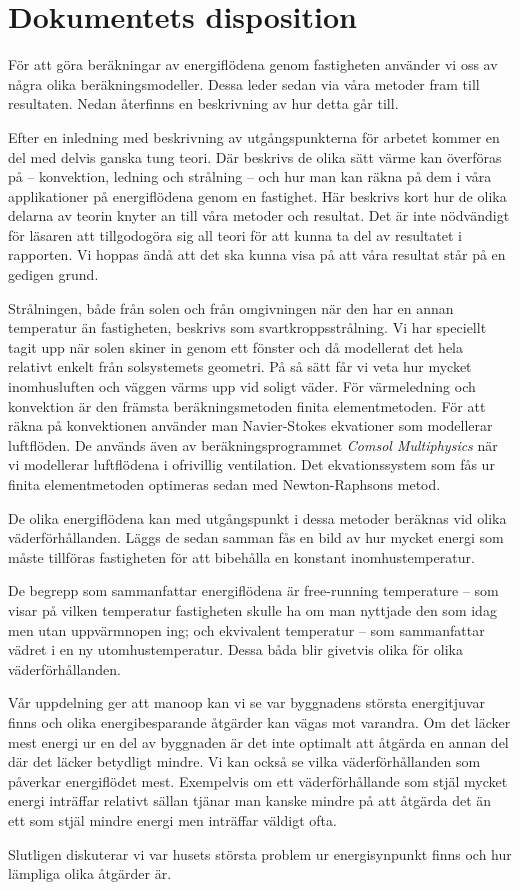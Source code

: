 \section{Dokumentets disposition}

För att göra beräkningar av energiflödena genom fastigheten använder vi oss av några olika beräkningsmodeller. Dessa leder sedan via våra metoder fram till resultaten. Nedan återfinns en beskrivning av hur detta går till.

Efter en inledning med beskrivning av utgångspunkterna för arbetet kommer en del med delvis ganska tung teori. Där beskrivs de olika sätt värme kan överföras på – konvektion, ledning och strålning – och hur man kan räkna på dem i våra applikationer på energiflödena genom en fastighet. Här beskrivs kort hur de olika delarna av teorin knyter an till våra metoder och resultat. Det är inte nödvändigt för läsaren att tillgodogöra sig all teori för att kunna ta del av resultatet i rapporten. Vi hoppas ändå att det ska kunna visa på att våra resultat står på en gedigen grund.

Strålningen, både från solen och från omgivningen när den har en annan temperatur än fastigheten, beskrivs som 
svartkroppsstrålning. Vi har speciellt tagit upp när solen skiner in genom ett fönster och då 
modellerat det hela relativt enkelt från solsystemets geometri. På så sätt får vi veta hur 
mycket inomhusluften och väggen värms upp vid soligt väder.
För värmeledning och konvektion är den främsta beräkningsmetoden finita 
elementmetoden. För att räkna på konvektionen använder man Navier-Stokes ekvationer 
som modellerar luftflöden. De används även av beräkningsprogrammet \emph{Comsol Multiphysics} när vi 
modellerar luftflödena i ofrivillig ventilation. Det ekvationssystem som fås ur finita
 elementmetoden optimeras sedan med Newton-Raphsons metod.

De olika energiflödena kan med utgångspunkt i dessa metoder beräknas vid olika väderförhållanden. Läggs de 
sedan samman fås en bild av hur mycket energi som måste tillföras fastigheten för att 
bibehålla en konstant inomhustemperatur.

De begrepp som sammanfattar energiflödena är free-running temperature – som visar på 
vilken temperatur fastigheten skulle ha om man nyttjade den som idag men utan 
uppvärmnopen ing; och ekvivalent temperatur – som sammanfattar vädret i en ny utomhustemperatur. Dessa båda blir givetvis olika för olika väderförhållanden.

Vår uppdelning ger att manoop kan vi se var byggnadens största energitjuvar finns och 
olika energibesparande åtgärder kan vägas mot varandra. Om det läcker mest energi ur en del av byggnaden är det inte optimalt att åtgärda en annan del där det läcker betydligt mindre. Vi kan också se vilka väderförhållanden som påverkar energiflödet mest. Exempelvis om ett väderförhållande som stjäl mycket energi inträffar relativt sällan tjänar man kanske mindre på att åtgärda det än ett som stjäl mindre energi men inträffar väldigt ofta.

Slutligen diskuterar vi var husets största problem ur energisynpunkt finns och hur lämpliga olika åtgärder är.
